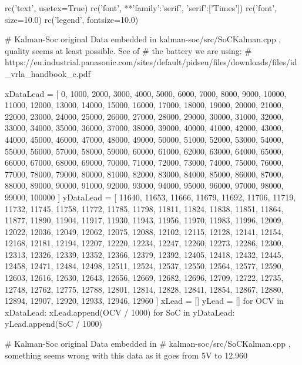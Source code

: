\begin{pylabcode}[plotsession]
rc('text', usetex=True)
rc('font', **{'family':'serif', 'serif':['Times']})
rc('font', size=10.0)			
rc('legend', fontsize=10.0)

# Kalman-Soc original Data embedded in kalman-soc/src/SoCKalman.cpp , quality seems at least possible. See of # the battery we are using: 
# https://eu.industrial.panasonic.com/sites/default/pidseu/files/downloads/files/id_vrla_handbook_e.pdf

xDataLead = [ 0, 1000, 2000, 3000, 4000, 5000, 6000, 7000, 8000, 9000, 10000, 11000, 12000, 13000, 14000, 15000, 16000, 17000, 18000, 19000, 20000, 21000, 22000, 23000, 24000, 25000, 26000, 27000, 28000, 29000, 30000, 31000, 32000, 33000, 34000, 35000, 36000, 37000, 38000, 39000, 40000, 41000, 42000, 43000, 44000, 45000, 46000, 47000, 48000, 49000, 50000, 51000, 52000, 53000, 54000, 55000, 56000, 57000, 58000, 59000, 60000, 61000, 62000, 63000, 64000, 65000, 66000, 67000, 68000, 69000, 70000, 71000, 72000, 73000, 74000, 75000, 76000, 77000, 78000, 79000, 80000, 81000, 82000, 83000, 84000, 85000, 86000, 87000, 88000, 89000, 90000, 91000, 92000, 93000, 94000, 95000, 96000, 97000, 98000, 99000, 100000 ]
yDataLead = [ 11640, 11653, 11666, 11679, 11692, 11706, 11719, 11732, 11745, 11758, 11772, 11785, 11798, 11811, 11824, 11838, 11851, 11864, 11877, 11890, 11904, 11917, 11930, 11943, 11956, 11970, 11983, 11996, 12009, 12022, 12036, 12049, 12062, 12075, 12088, 12102, 12115, 12128, 12141, 12154, 12168, 12181, 12194, 12207, 12220, 12234, 12247, 12260, 12273, 12286, 12300, 12313, 12326, 12339, 12352, 12366, 12379, 12392, 12405, 12418, 12432, 12445, 12458, 12471, 12484, 12498, 12511, 12524, 12537, 12550, 12564, 12577, 12590, 12603, 12616, 12630, 12643, 12656, 12669, 12682, 12696, 12709, 12722, 12735, 12748, 12762, 12775, 12788, 12801, 12814, 12828, 12841, 12854, 12867, 12880, 12894, 12907, 12920, 12933, 12946, 12960 ]
xLead = []
yLead = []
for OCV in xDataLead:
    xLead.append(OCV / 1000)
for SoC in yDataLead:
    yLead.append(SoC / 1000)

# Kalman-Soc original Data embedded in  
# kalman-soc/src/SoCKalman.cpp , something seems wrong with this data as it goes from 5V to 12.960   


\end{pylabcode}
